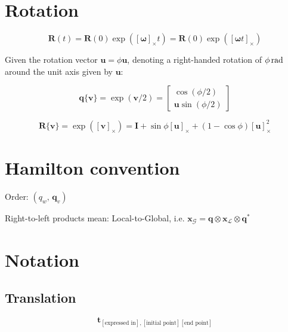 \documentclass[11pt,a4paper]{scrartcl}
\renewcommand\vec{\bm}
\newcommand{\quat}[1]{\mathbf{#1}}
\newcommand{\Matrix}[1]{\mathbf{#1}}
\newcommand{\skewop}[1]{\left[ #1 \right]_\times}
\newcommand{\qprod}{\otimes}
\begin{document}
\section{Rotation}

\begin{equation}
	\Matrix{R}(t)
	=
	\Matrix{R}(0) \exp \left( \skewop{\vec{\omega}} t \right)
	=
	\Matrix{R}(0) \exp \left( \skewop{\vec{\omega} t} \right)
\end{equation}

Given the rotation vector $\vec{u} = \phi \vec{u}$, denoting a right-handed rotation of $\unit[\phi]{rad}$ around the unit axis given by $\vec{u}$:

\begin{equation}
	\quat{q}\lbrace\vec{v}\rbrace
	=
	\exp(\vec{v}/2)
	=
	\begin{bmatrix}
		\cos(\phi/2) \\ \vec{u} \sin(\phi/2)
	\end{bmatrix}
\end{equation}

\begin{equation}
	\Matrix{R}\lbrace\vec{v}\rbrace
	=
	\exp \left( \skewop{\vec{v}} \right)
	=
	\Matrix{I} + \sin \phi \skewop{\vec{u}} + (1 - \cos \phi) \skewop{\vec{u}}^2
\end{equation}

\section{Hamilton convention}

Order:
\begin{math}
	\left( q_w \text{, } \vec{q}_v \right)
\end{math}

Right-to-left products mean: Local-to-Global, i.e.
\begin{math}
	\vec{x}_\mathcal{G} = \quat{q} \qprod \vec{x}_\mathcal{L} \qprod \quat{q}^*
\end{math}

\section{Notation}

\subsection{Translation}

\begin{equation}
	\vec{t}_{[\text{expressed in}], [\text{initial point}][\text{end point}]}
\end{equation}
\end{document}
